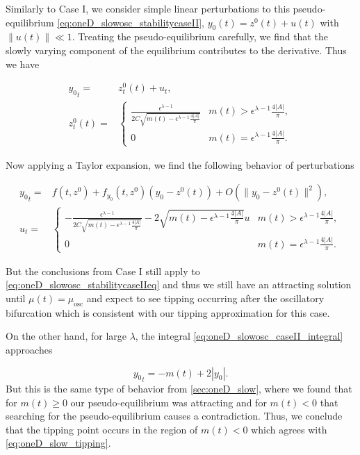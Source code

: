 Similarly to Case I, we consider simple linear perturbations to this pseudo-equilibrium \eqref{eq:oneD_slowosc_stabilitycaseII}, $y_0(t)=z^0(t)+u(t)$ with $\lVert u(t) \rVert \ll 1$. Treating the pseudo-equilibrium carefully, we find that the slowly varying component of the equilibrium contributes to the derivative. Thus we have

\begin{equation}
\begin{aligned}
{y_0}_t =& z^0_t(t) +u_t,\\
z^0_t(t) = & \begin{cases}
\frac{\epsilon^{\lambda-1}}{2C\sqrt{m(t)-\epsilon^{\lambda-1}\frac{4|A|}{\pi}}} & m(t)> \epsilon^{\lambda-1}\frac{4|A|}{\pi},\\
0 & m(t) =\epsilon^{\lambda-1}\frac{4|A|}{\pi}.
\end{cases}
\end{aligned}
\end{equation}

Now applying a Taylor expansion, we find the following behavior of perturbations

\begin{equation}\label{eq:oneD_slowosc_stabilitycaseIIeq}
\begin{aligned}
{y_0}_t =& f(t,z^0)+f_{y_0}(t,z^0)(y_0-z^0(t))+O(\lVert y_0-z^0(t) \rVert^2),\\
u_t =&\begin{cases}
-\frac{\epsilon^{\lambda-1}}{2C\sqrt{m(t)-\epsilon^{\lambda-1}\frac{4|A|}{\pi}}}-2\sqrt{m(t)-\epsilon^{\lambda-1}\frac{4|A|}{\pi}} u & m(t)>\epsilon^{\lambda-1}\frac{4|A|}{\pi},\\
0 & m(t)=\epsilon^{\lambda-1}\frac{4|A|}{\pi}.
\end{cases}
\end{aligned}
\end{equation}

But the conclusions from Case I still apply to \eqref{eq:oneD_slowosc_stabilitycaseIIeq} and thus we still have an attracting solution until $\mu(t)=\mu_{\text{osc}}$ and expect to see tipping occurring after the oscillatory bifurcation which is consistent with our tipping approximation for this case.

On the other hand, for large $\lambda$, the integral \eqref{eq:oneD_slowosc_caseII_integral} approaches

\begin{equation}\label{eq:oneD_slowosc_stabilitycaseII}
{y_0}_t=-m(t)+2|y_0|.
\end{equation}
But this is the same type of behavior from \autoref{sec:oneD_slow}, where we found that for $m(t)\ge 0$ our pseudo-equilibrium was attracting and for $m(t)<0$ that searching for the pseudo-equilibrium causes a contradiction. Thus, we conclude that the tipping point occurs in the region of $m(t)<0$ which agrees with \eqref{eq:oneD_slow_tipping}.
